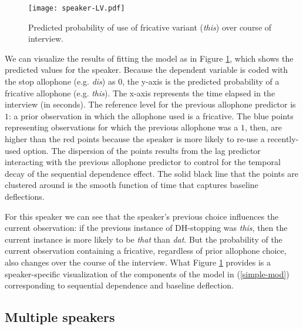 \documentclass[12pt]{article}
\begin{document}
\begin{figure}
    \centering
    \texttt{[image: speaker-LV.pdf]}
    \caption{Predicted probability of use of fricative variant (\emph{this}) over course of interview.}
    \label{fig:style-speaker}
\end{figure}

We can visualize the results of fitting the model as in Figure \ref{fig:style-speaker}, which shows the predicted values for the speaker. Because the dependent variable is coded with the stop allophone (e.g. \emph{dis}) as $0$, the y-axis is the predicted probability of a fricative allophone (e.g. \emph{this}). The x-axis represents the time elapsed in the interview (in seconds). The reference level for the previous allophone predictor is $1$: a prior observation in which the allophone used is a fricative. The blue points representing observations for which the previous allophone was a $1$, then, are higher than the red points because the speaker is more likely to re-use a recently-used option. The dispersion of the points results from the lag predictor interacting with the previous allophone predictor to control for the temporal decay of the sequential dependence effect. The solid black line that the points are clustered around is the smooth function of time that captures baseline deflections.

For this speaker we can see that the speaker's previous choice influences the current observation: if the previous instance of DH-stopping was \emph{this}, then the current instance is more likely to be \emph{that} than \emph{dat}. But the probability of the current observation containing a fricative, regardless of prior allophone choice, also changes over the course of the interview. What Figure \ref{fig:style-speaker} provides is a speaker-specific visualization of the  components of the model in (\ref{simple-mod}) corresponding to sequential dependence and baseline deflection.

\subsection{Multiple speakers}
\end{document}
